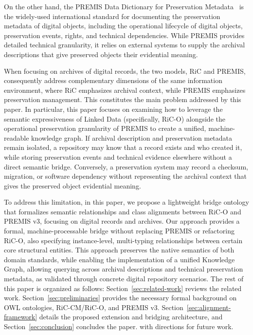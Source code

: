 \documentclass[runningheads]{llncs}
\begin{document}
On the other hand, the PREMIS Data Dictionary for Preservation Metadata~\cite{premis_data_dictionary_2015} is the widely-used international standard for documenting the preservation metadata of digital objects, including the operational lifecycle of digital objects, preservation events, rights, and technical dependencies. While PREMIS provides detailed technical granularity, it relies on external systems to supply the archival descriptions that give preserved objects their evidential meaning. 

When focusing on archives of digital records, the two models, RiC and PREMIS, consequently address complementary dimensions of the same information environment, where RiC emphasizes archival context, while PREMIS emphasizes preservation management. This constitutes the main problem addressed by this paper. In particular, this paper focuses on examining how to leverage the semantic expressiveness of Linked Data (specifically, RiC-O) alongside the operational preservation granularity of PREMIS to create a unified, machine-readable knowledge graph.  If archival description and preservation metadata remain isolated, a repository may know that a record exists and who created it, while storing preservation events and technical evidence elsewhere without a direct semantic bridge. Conversely, a preservation system may record a checksum, migration, or software dependency without representing the archival context that gives the preserved object evidential meaning.

To address this limitation, in this paper, we propose a lightweight bridge ontology that formalizes semantic relationships and class alignments between RiC-O and PREMIS v3, focusing on digital records and archives.  
Our approach provides a formal, machine-processable bridge without replacing PREMIS or refactoring RiC-O, also specifying  instance-level, multi-typing relationships between certain core structural entities. This approach preserves the native semantics of both domain standards, while enabling the implementation of a unified Knowledge Graph, allowing querying across archival descriptions and technical preservation metadata, as validated through concrete digital repository scenarios.
The rest of this paper is organized as follows: Section~\ref{sec:related-work} reviews the related work. Section~\ref{sec:preliminaries} provides the necessary formal background on OWL ontologies, RiC-CM/RiC-O, and PREMIS v3. 
Section~\ref{sec:alignment-framework} details the proposed extension and bridging architecture,
and Section~\ref{sec:conclusion} concludes the paper.
 with directions for future work. 
\end{document}
